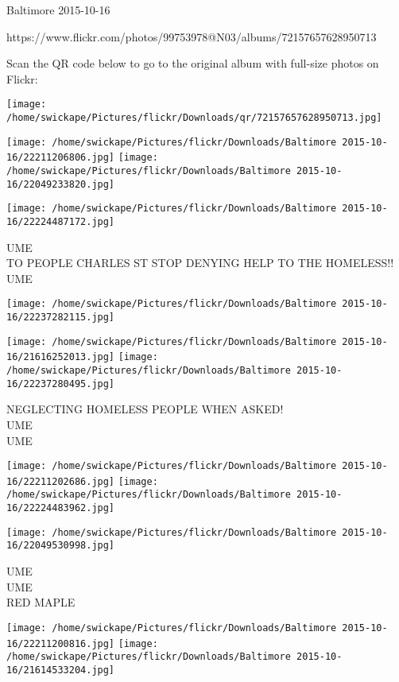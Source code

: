 \documentclass[10pt,letterpaper]{article}
\begin{document}
Baltimore 2015-10-16

https://www.flickr.com/photos/99753978@N03/albums/72157657628950713

Scan the QR code below to go to the original album with full-size photos on Flickr:

\texttt{[image: /home/swickape/Pictures/flickr/Downloads/qr/72157657628950713.jpg]}
\pagebreak

\texttt{[image: /home/swickape/Pictures/flickr/Downloads/Baltimore 2015-10-16/22211206806.jpg]}
\texttt{[image: /home/swickape/Pictures/flickr/Downloads/Baltimore 2015-10-16/22049233820.jpg]}

\texttt{[image: /home/swickape/Pictures/flickr/Downloads/Baltimore 2015-10-16/22224487172.jpg]}

UME\\
TO PEOPLE CHARLES ST STOP DENYING HELP TO THE HOMELESS!!\\
UME
\pagebreak

\texttt{[image: /home/swickape/Pictures/flickr/Downloads/Baltimore 2015-10-16/22237282115.jpg]}

\vspace{0.25in}
\texttt{[image: /home/swickape/Pictures/flickr/Downloads/Baltimore 2015-10-16/21616252013.jpg]}
\texttt{[image: /home/swickape/Pictures/flickr/Downloads/Baltimore 2015-10-16/22237280495.jpg]}

NEGLECTING HOMELESS PEOPLE WHEN ASKED!\\
UME\\
UME
\pagebreak

\texttt{[image: /home/swickape/Pictures/flickr/Downloads/Baltimore 2015-10-16/22211202686.jpg]}
\texttt{[image: /home/swickape/Pictures/flickr/Downloads/Baltimore 2015-10-16/22224483962.jpg]}

\vspace{0.25in}
\texttt{[image: /home/swickape/Pictures/flickr/Downloads/Baltimore 2015-10-16/22049530998.jpg]}

UME\\
UME\\
RED MAPLE
\pagebreak

\texttt{[image: /home/swickape/Pictures/flickr/Downloads/Baltimore 2015-10-16/22211200816.jpg]}
\texttt{[image: /home/swickape/Pictures/flickr/Downloads/Baltimore 2015-10-16/21614533204.jpg]}
\end{document}
